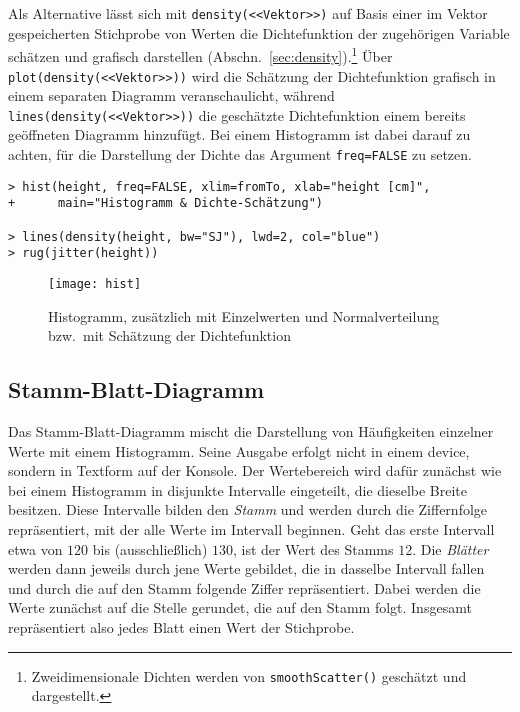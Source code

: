 Als Alternative lässt sich mit  \lstinline!density(<<Vektor>>)! auf Basis einer im Vektor gespeicherten Stichprobe von Werten die Dichtefunktion der zugehörigen Variable schätzen und grafisch darstellen (Abschn.\ \ref{sec:density}).\footnote{Zweidimensionale Dichten werden von  \lstinline!smoothScatter()! geschätzt und dargestellt.} Über \lstinline!plot(density(<<Vektor>>))! wird die Schätzung der Dichtefunktion grafisch in einem separaten Diagramm veranschaulicht, während \lstinline!lines(density(<<Vektor>>))! die geschätzte Dichtefunktion einem bereits geöffneten Diagramm hinzufügt. Bei einem Histogramm ist dabei darauf zu achten, für die Darstellung der Dichte das Argument \lstinline!freq=FALSE! zu setzen.
\begin{lstlisting}
> hist(height, freq=FALSE, xlim=fromTo, xlab="height [cm]",
+      main="Histogramm & Dichte-Schätzung")

> lines(density(height, bw="SJ"), lwd=2, col="blue")
> rug(jitter(height))
\end{lstlisting}

\begin{figure}[ht]
\centering
\texttt{[image: hist]}
\vspace*{-1em}
\caption{Histogramm, zusätzlich mit Einzelwerten und Normalverteilung bzw.\ mit Schätzung der Dichtefunktion}
\label{fig:hist}
\end{figure}

\subsection{Stamm-Blatt-Diagramm}

Das Stamm-Blatt-Diagramm mischt die Darstellung von Häufigkeiten einzelner Werte mit einem Histogramm. Seine Ausgabe erfolgt nicht in einem device, sondern in Textform auf der Konsole. Der Wertebereich wird dafür zunächst wie bei einem Histogramm in disjunkte Intervalle eingeteilt, die dieselbe Breite besitzen. Diese Intervalle bilden den \emph{Stamm} und werden durch die Ziffernfolge repräsentiert, mit der alle Werte im Intervall beginnen. Geht das erste Intervall etwa von $120$ bis (ausschließlich) $130$, ist der Wert des Stamms $12$. Die \emph{Blätter} werden dann jeweils durch jene Werte gebildet, die in dasselbe Intervall fallen und durch die auf den Stamm folgende Ziffer repräsentiert. Dabei werden die Werte zunächst auf die Stelle gerundet, die auf den Stamm folgt. Insgesamt repräsentiert also jedes Blatt einen Wert der Stichprobe.

